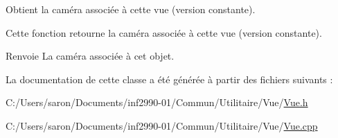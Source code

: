 Obtient la caméra associée à cette vue (version constante). 

Cette fonction retourne la caméra associée à cette vue (version constante).

\begin{DoxyReturn}{Renvoie}
La caméra associée à cet objet. 
\end{DoxyReturn}


La documentation de cette classe a été générée à partir des fichiers suivants \-:\begin{DoxyCompactItemize}
\item 
C\-:/\-Users/saron/\-Documents/inf2990-\/01/\-Commun/\-Utilitaire/\-Vue/\hyperlink{_vue_8h}{Vue.\-h}\item 
C\-:/\-Users/saron/\-Documents/inf2990-\/01/\-Commun/\-Utilitaire/\-Vue/\hyperlink{_vue_8cpp}{Vue.\-cpp}\end{DoxyCompactItemize}
